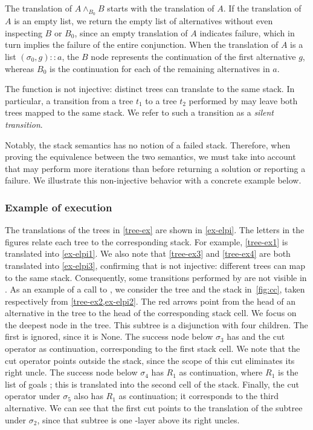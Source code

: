 \documentclass[sigplan,10pt,anonymous,review]{acmart}
\begin{document}
The translation of $A \land_{B_0} B$ starts with the translation of $A$. If the
translation of $A$ is an empty list, we return the empty list of
alternatives without even inspecting $B$ or $B_0$, since an empty
translation of $A$ indicates failure, which in turn implies the
failure of the entire conjunction. When the translation of $A$ is
a list $(\sigma_0, g) :: a$, the $B$ node represents the continuation of the
first alternative $g$, whereas $B_0$ is the continuation for each of the
remaining alternatives in $a$.

The function \ttl is not injective: distinct trees can translate to the
same stack. In particular, a transition from a tree $t_1$ to a tree $t_2$
performed by \run may leave both trees mapped to the same
stack. We refer to such a transition as a \emph{silent transition}.

Notably, the stack semantics has no notion of a failed stack. Therefore, when
proving the equivalence between the two semantics, we must take into account
that \run may perform more iterations than \nur before returning a solution or
reporting a failure. We illustrate this non-injective behavior with a concrete
example below.


\subsubsection{Example of \ttl execution}
The translations of the trees in \cref{tree-ex} are shown in \cref{ex-elpi}.
The letters in the figures relate each tree to the corresponding stack.
For example, \ref{tree-ex1} is translated into \ref{ex-elpi1}. We also
note that \ref{tree-ex3} and \ref{tree-ex4} are both translated into
\ref{ex-elpi3}, confirming that \ttl is not injective: different trees can map to
the same stack. Consequently, some transitions performed by \run are not visible
in \nur.
%
As an example of a call to \ttl, we consider the tree and the stack in~\cref{fig:cc},
taken respectively from \cref{tree-ex2,ex-elpi2}. The red arrows
point from the head of an alternative in the tree to the head of the
corresponding stack cell. %
We focus on the deepest \orC{} node in the tree. This subtree
is a disjunction with four children. The first is ignored, since it
is None. The success node below $\sigma_3$ has  and the cut
operator as continuation, corresponding to the first stack cell. %
We note that the cut operator points outside the
stack, since the scope of this cut eliminates its right uncle. The
success node below $\sigma_4$ has $R_1$ as continuation, where $R_1$ is
the list of goals ; this is translated into the second cell
of the stack. Finally, the cut operator under
$\sigma_5$ also has $R_1$ as continuation; it corresponds to the third
alternative. We can see that the first cut points to
the translation of the subtree under $\sigma_2$, since that subtree is one
\orC-layer above its right uncles.
\end{document}
